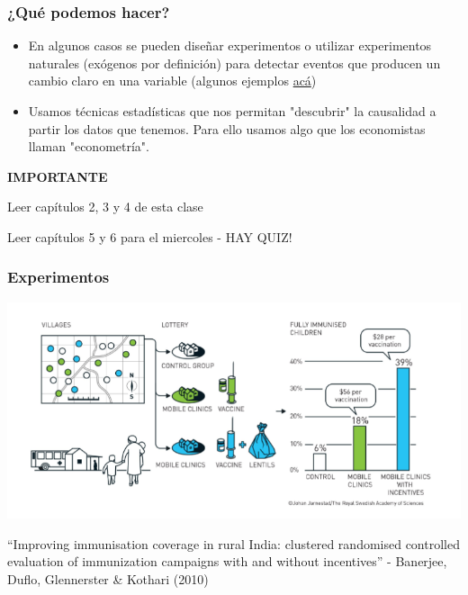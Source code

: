 \documentclass{beamer}
\begin{document}
\begin{frame} 
    \frametitle{¿Qué podemos hacer?}
    \begin{itemize}
        \item  En algunos casos se pueden diseñar experimentos o utilizar experimentos naturales (exógenos por definición) para detectar eventos que producen un cambio claro en una variable (algunos ejemplos \hyperlink{appendix}{acá})
        \item Usamos técnicas estadísticas que nos permitan "descubrir" la causalidad a partir los datos que tenemos. Para ello usamos algo que los economistas llaman "econometría". 
    \end{itemize}
\end{frame}

\begin{frame}
    \begin{center}
        \LARGE  \textbf{IMPORTANTE}  \\ \vspace{1cm}
        \Large 
        \begin{boxB}
        \centering Leer capítulos 2, 3 y 4 de esta clase
        \end{boxB}
        \vspace{0.5cm}
        \begin{boxB}
        Leer capítulos 5 y 6 para el miercoles - HAY QUIZ!
        \end{boxB}
    \end{center}
\end{frame}

\begin{frame} \label{appendix}
    \frametitle{Experimentos}
    \begin{center}
        \includegraphics[scale=0.7]{../Figures/Duflo.png}
    \end{center}
    “Improving immunisation coverage in rural India: clustered randomised controlled evaluation of immunization campaigns with and without incentives” - Banerjee, Duflo, Glennerster \& Kothari (2010) \\  \vspace{2mm}
\end{frame}
    
\end{document}

